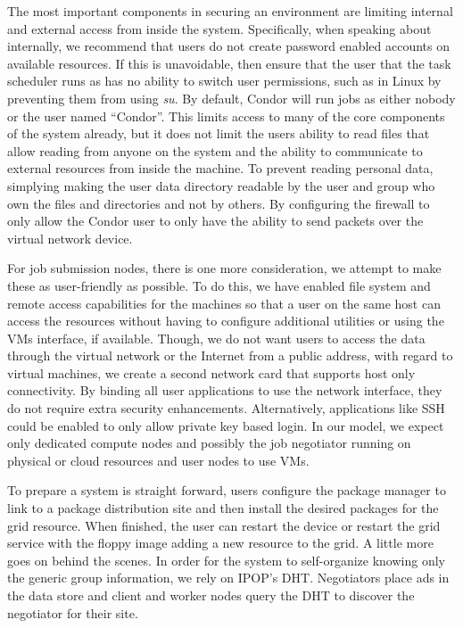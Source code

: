 \documentclass{sig-alternate}
\begin{document}
The most important components in securing an environment are limiting internal
and external access from inside the system.  Specifically, when speaking about
internally, we recommend that users do not create password enabled accounts on
available resources.  If this is unavoidable, then ensure that the user that
the task scheduler runs as has no ability to switch user permissions, such as
in Linux by preventing them from using \textit{su}.  By default, Condor will
run jobs as either nobody or the user named ``Condor''.  This limits access to
many of the core components of the system already, but it does not limit the
users ability to read files that allow reading from anyone on the system
and the ability to communicate to external resources from inside the machine.
To prevent reading personal data, simplying making the user data directory
readable by the user and group who own the files and directories and not by
others.  By configuring the firewall to only allow the Condor user to only have
the ability to send packets over the virtual network device.

For job submission nodes, there is one more consideration, we attempt to make
these as user-friendly as possible.  To do this, we have enabled file system
and remote access capabilities for the machines so that a user on the same
host can access the resources without having to configure additional utilities
or using the VMs interface, if available.  Though, we do not want users to
access the data through the virtual network or the Internet from a public
address, with regard to virtual machines, we create a second network card that
supports host only connectivity.  By binding all user applications to use the
network interface, they do not require extra security enhancements.
Alternatively, applications like SSH could be enabled to only allow private key
based login.  In our model, we expect only dedicated compute nodes and possibly
the job negotiator running on physical or cloud resources and user nodes to
use VMs.

To prepare a system is straight forward, users configure the package manager to
link to a package distribution site and then install the desired packages for
the grid resource.  When finished, the user can restart the device or restart
the grid service with the floppy image adding a new resource to the grid.  A
little more goes on behind the scenes.  In order for the system to self-organize
knowing only the generic group information, we rely on IPOP's DHT.  Negotiators
place ads in the data store and client and worker nodes query the DHT to
discover the negotiator for their site.
\end{document}
